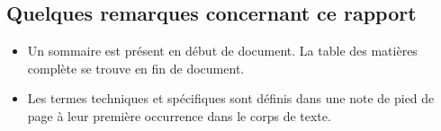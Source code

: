 \subsection*{Quelques remarques concernant ce rapport}
\begin{itemize}
\setlength{\itemsep}{8pt}
  \item{Un sommaire est présent en début de document. La table des matières
  complète se trouve en fin de document.}

  \item{Les termes techniques et spécifiques sont définis dans une note de pied
  de page à leur première occurrence dans le corps de texte.}
\end{itemize}

\clearpage

